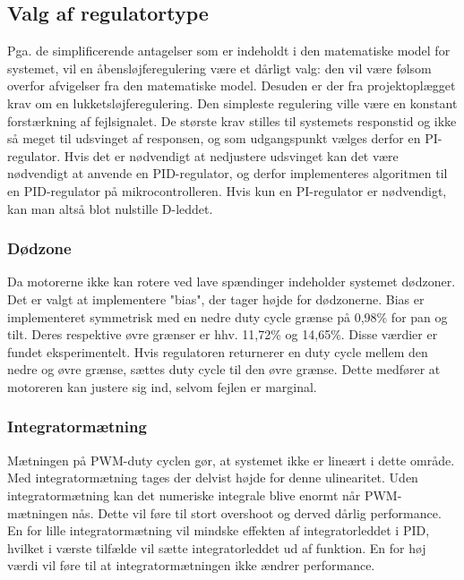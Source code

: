 \subsection{Valg af regulatortype}
\label{ss:ValgReg}
Pga. de simplificerende antagelser som er indeholdt i den matematiske model for systemet,
vil en åbensløjferegulering være et dårligt valg: den vil være følsom overfor afvigelser fra den
matematiske model. Desuden er der fra projektoplægget krav om en lukketsløjferegulering.
Den simpleste regulering ville være en konstant forstærkning af fejlsignalet.
De største krav stilles til systemets responstid og ikke så meget til udsvinget af responsen,
og som udgangspunkt vælges derfor en PI-regulator.
Hvis det er nødvendigt at nedjustere udsvinget kan det være nødvendigt at anvende en PID-regulator,
og derfor implementeres algoritmen til en PID-regulator på mikrocontrolleren.
Hvis kun en PI-regulator er nødvendigt, kan man altså blot nulstille D-leddet.

\subsubsection{Dødzone}
Da motorerne ikke kan rotere ved lave spændinger indeholder systemet dødzoner.
Det er valgt at implementere "bias", der tager højde for dødzonerne.
Bias er implementeret symmetrisk med en nedre duty cycle grænse på 0,98\% for pan og tilt.
Deres respektive øvre grænser er hhv. 11,72\% og 14,65\%.
Disse værdier er fundet eksperimentelt.
Hvis regulatoren returnerer en duty cycle mellem den nedre og øvre grænse, sættes duty cycle til den øvre grænse.
Dette medfører at motoreren kan justere sig ind, selvom fejlen er marginal.

\subsubsection{Integratormætning}
Mætningen på PWM-duty cyclen gør, at systemet ikke er lineært i dette område. Med integratormætning 
tages der delvist højde for denne ulinearitet. Uden integratormætning kan det numeriske integrale blive enormt når 
PWM-mætningen nås. Dette vil føre til stort overshoot og derved dårlig 
performance. 
En for lille integratormætning vil mindske effekten af integratorleddet i PID, 
hvilket i værste tilfælde vil sætte integratorleddet ud af funktion.
En for høj værdi vil føre til at integratormætningen ikke ændrer performance.



